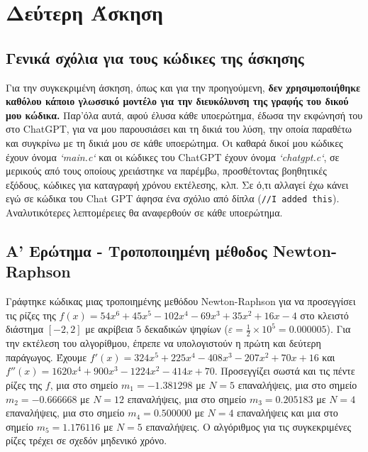 \documentclass[a4paper, 14pt]{article}   %
\begin{document}
\vspace{2\baselineskip}

\section*{Δεύτερη Άσκηση}   %

\subsection*{Γενικά σχόλια για τους κώδικες της άσκησης}   %
	Για την συγκεκριμένη άσκηση, όπως και για την προηγούμενη, \textbf{δεν χρησιμοποιήθηκε καθόλου κάποιο γλωσσικό μοντέλο για την διευκόλυνση της γραφής του δικού μου κώδικα.} Παρ'όλα αυτά, αφού έλυσα κάθε υποερώτημα, έδωσα την εκφώνησή του στο ChatGPT, για να μου παρουσιάσει και τη δικιά του λύση, την οποία παραθέτω και συγκρίνω με τη δικιά μου σε κάθε υποερώτημα. Οι καθαρά δικοί μου κώδικες έχουν όνομα \emph{`main.c`} και οι κώδικες του ChatGPT έχουν όνομα \emph{`chatgpt.c`}, σε μερικούς από τους οποίους χρειάστηκε να παρέμβω, προσθέτοντας βοηθητικές εξόδους, κώδικες για καταγραφή χρόνου εκτέλεσης, κλπ. Σε ό,τι αλλαγεί έχω κάνει εγώ σε κώδικα του Chat GPT άφησα ένα σχόλιο από δίπλα (\texttt{//I added this}). Αναλυτικότερες λεπτομέρειες θα αναφερθούν σε κάθε υποερώτημα.

\subsection*{Α' Ερώτημα - Τροποποιημένη μέθοδος Newton-Raphson}   %

Γράφτηκε κώδικας μιας τροποιημένης μεθόδου Newton-Raphson για να προσεγγίσει τις ρίζες της \(f(x) = 54x^6 + 45x^5 - 102x^4 - 69x^3 + 35x^2 + 16x - 4\) στο κλειστό διάστημα \([-2,2]\) με ακρίβεια $5$ δεκαδικών ψηφίων (\(\varepsilon = \frac{1}{2} \times 10^5 = 0.000005\)). Για την εκτέλεση του αλγορίθμου, έπρεπε να υπολογιστούν η πρώτη και δεύτερη παράγωγος. Έχουμε \(f'(x) = 324x^5 + 225x^4 - 408x^3 - 207x^2 + 70x + 16\) και \(f''(x) = 1620x^4 + 900x^3 - 1224x^2 - 414x + 70\). Προσεγγίζει σωστά και τις πέντε ρίζες της \(f\), μια στο σημείο \(m_1 = -1.381298\) με \(N = 5\) επαναλήψεις, μια στο σημείο \(m_2 = -0.666668\) με \(N = 12\) επαναλήψεις, μια στο σημείο \(m_3 = 0.205183\) με \(N = 4\) επαναλήψεις, μια στο σημείο \(m_4 = 0.500000\) με \(N = 4\) επαναλήψεις και μια στο σημείο \(m_5 = 1.176116\) με \(N = 5\) επαναλήψεις. Ο αλγόριθμος για τις συγκεκριμένες ρίζες τρέχει σε σχεδόν μηδενικό χρόνο.\\
\end{document}
